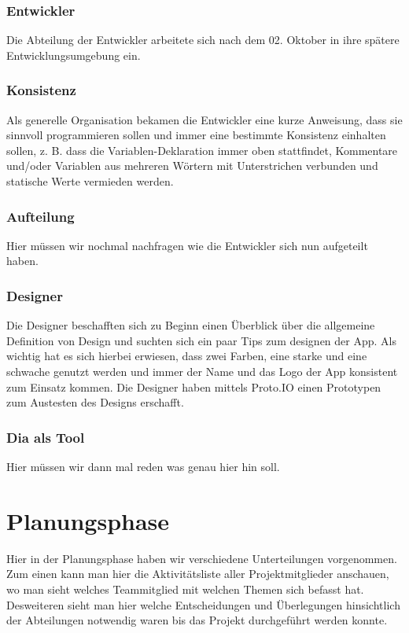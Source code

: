 \documentclass[12pt,a4paper]{article}
\begin{document}
\newpage

\subsubsection{Entwickler}
Die Abteilung der Entwickler arbeitete sich nach dem 02. Oktober in ihre spätere Entwicklungsumgebung ein.
\subsubsection*{Konsistenz}
Als generelle Organisation bekamen die Entwickler eine kurze Anweisung, dass sie sinnvoll programmieren sollen und immer eine bestimmte Konsistenz einhalten sollen, z. B. dass die Variablen-Deklaration immer oben stattfindet, Kommentare und/oder Variablen aus mehreren Wörtern mit Unterstrichen verbunden und statische Werte vermieden werden.
\subsubsection*{Aufteilung}
Hier müssen wir nochmal nachfragen wie die Entwickler sich nun aufgeteilt haben.

\subsubsection{Designer}
Die Designer beschafften sich zu Beginn einen Überblick über die allgemeine Definition von Design und suchten sich ein paar Tips zum designen der App.
Als wichtig hat es sich hierbei erwiesen, dass zwei Farben, eine starke und eine schwache genutzt werden und immer der Name und das Logo der App konsistent zum Einsatz kommen. Die Designer haben mittels  Proto.IO einen Prototypen zum Austesten des Designs erschafft.
\subsubsection*{Dia als Tool}
Hier müssen wir dann mal reden was genau hier hin soll.


\newpage

\section{Planungsphase}
Hier in der Planungsphase haben wir verschiedene Unterteilungen vorgenommen. Zum einen kann man hier die Aktivitätsliste aller Projektmitglieder anschauen,  wo man sieht welches Teammitglied mit welchen Themen sich befasst hat. 
Desweiteren sieht man hier welche Entscheidungen und Überlegungen hinsichtlich der Abteilungen notwendig waren bis das Projekt durchgeführt werden konnte.
\end{document}
